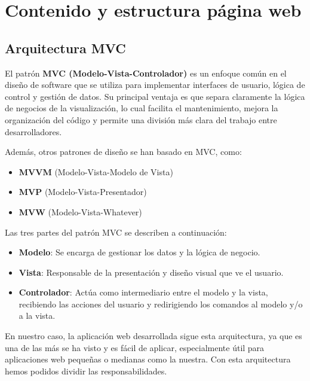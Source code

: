 \documentclass[10pt]{book}
\begin{document}
\section{Contenido y estructura página web} 
\subsection{Arquitectura MVC} 

\cite{mdn_mvc}El patrón \textbf{MVC (Modelo-Vista-Controlador)} es un enfoque común en el diseño de software que se utiliza para implementar interfaces de usuario, lógica de control y gestión de datos. Su principal ventaja es que separa claramente la lógica de negocios de la visualización, lo cual facilita el mantenimiento, mejora la organización del código y permite una división más clara del trabajo entre desarrolladores.

Además, otros patrones de diseño se han basado en MVC, como:
\begin{itemize}
    \item \textbf{MVVM} (Modelo-Vista-Modelo de Vista)
    \item \textbf{MVP} (Modelo-Vista-Presentador)
    \item \textbf{MVW} (Modelo-Vista-Whatever)
\end{itemize}

Las tres partes del patrón MVC se describen a continuación:

\begin{itemize}
    \item \textbf{Modelo}: Se encarga de gestionar los datos y la lógica de negocio.
    \item \textbf{Vista}: Responsable de la presentación y diseño visual que ve el usuario.
    \item \textbf{Controlador}: Actúa como intermediario entre el modelo y la vista, recibiendo las acciones del usuario y redirigiendo los comandos al modelo y/o a la vista.
\end{itemize}

En nuestro caso, la aplicación web desarrollada sigue esta arquitectura, ya que es una de las más se ha visto y es fácil de aplicar, especialmente útil para aplicaciones web pequeñas o medianas como la nuestra. Con esta arquitectura hemos podidos dividir las responsabilidades.
\end{document}
